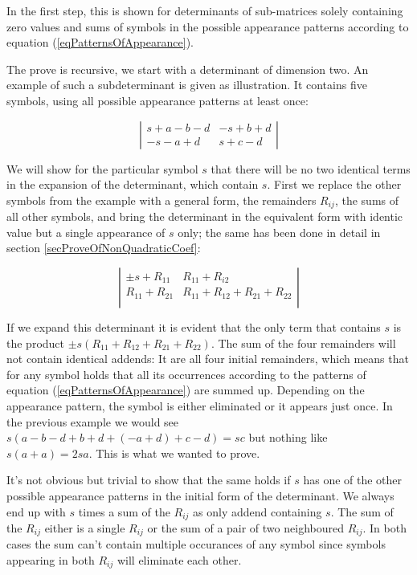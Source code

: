 \noindent
In the first step, this is shown for determinants of sub-matrices solely
containing zero values and sums of symbols in the possible appearance
patterns according to equation (\ref{eqPatternsOfAppearance}).

The prove is recursive, we start with a determinant of dimension two. An
example of such a subdeterminant is given as illustration. It contains
five symbols, using all possible appearance patterns at least once:

\begin{displaymath}
\left|
\begin{array}{cc}
s+a-b-d   &   -s+b+d  \\
-s-a+d    &   s+c-d
\end{array}
\right|
\end{displaymath}

We will show for the particular symbol $s$ that there will be no two
identical terms in the expansion of the determinant, which contain $s$.
First we replace the other symbols from the example with a general form,
the remainders $R_{ij}$, the sums of all other symbols, and bring the
determinant in the equivalent form with identic value but a single
appearance of $s$ only; the same has been done in detail in section
\ref{secProveOfNonQuadraticCoef}:

\begin{displaymath}
\left|
\begin{array}{cc}
\pm s + R_{11}  & R_{11} + R_{i2}                   \\
R_{11} + R_{21} & R_{11} + R_{12} + R_{21} + R_{22} \\
\end{array}
\right|
\end{displaymath}

If we expand this determinant it is evident that the only term that
contains $s$ is the product $\pm s(R_{11} + R_{12} + R_{21} + R_{22})$.
The sum of the four remainders will not contain identical addends: It are
all four initial remainders, which means that for any symbol holds that
all its occurrences according to the patterns of equation
(\ref{eqPatternsOfAppearance}) are summed up. Depending on the appearance
pattern, the symbol is either eliminated or it appears just once. In the
previous example we would see $s(a-b-d + b+d + (-a+d) + c-d) = sc$ but
nothing like $s(a+a) = 2sa$. This is what we wanted to prove.

It's not obvious but trivial to show that the same holds if $s$ has one of
the other possible appearance patterns in the initial form of the
determinant. We always end up with $s$ times a sum of the $R_{ij}$ as only
addend containing $s$. The sum of the $R_{ij}$ either is a single $R_{ij}$
or the sum of a pair of two neighboured $R_{ij}$. In both cases the sum
can't contain multiple occurances of any symbol since symbols appearing in
both $R_{ij}$ will eliminate each other.


